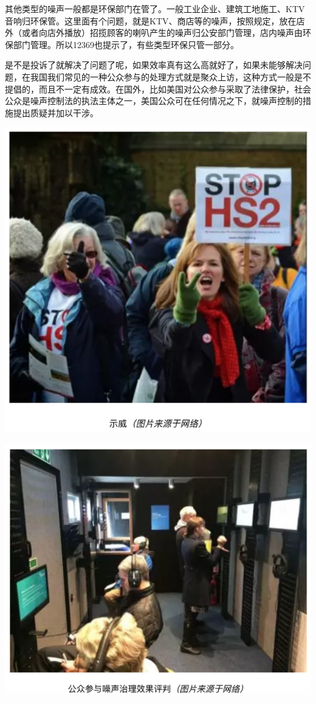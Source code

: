 \documentclass[]{book}
\begin{document}
其他类型的噪声一般都是环保部门在管了。一般工业企业、建筑工地施工、KTV音响归环保管。这里面有个问题，就是KTV、商店等的噪声，按照规定，放在店外（或者向店外播放）招揽顾客的喇叭产生的噪声归公安部门管理，店内噪声由环保部门管理。所以12369也提示了，有些类型环保只管一部分。

是不是投诉了就解决了问题了呢，如果效率真有这么高就好了，如果未能够解决问题，在我国我们常见的一种公众参与的处理方式就是聚众上访，这种方式一般是不提倡的，而且不一定有成效。在国外，比如美国对公众参与采取了法律保护，社会公众是噪声控制法的执法主体之一，美国公众可在任何情况之下，就噪声控制的措施提出质疑并加以干涉。

\includegraphics[width=8.33in]{images/zaosheng4}

\includegraphics[width=8.33in]{images/zaosheng5}
\end{document}
